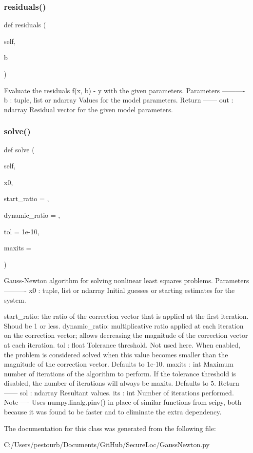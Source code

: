 \subsubsection{\texorpdfstring{residuals()}{residuals()}}
{\footnotesize\ttfamily def residuals (\begin{DoxyParamCaption}\item[{}]{self,  }\item[{}]{b }\end{DoxyParamCaption})}

\begin{DoxyVerb}Evaluate the residuals f(x, b) - y with the given parameters.
Parameters
----------
b : tuple, list or ndarray
    Values for the model parameters.
Return
------
out : ndarray
    Residual vector for the given model parameters.
\end{DoxyVerb}
 \mbox{\label{class_gauss_newton_1_1_g_ndataset_a761f3746fb20b84ec70f2939300ca517}} 
\subsubsection{\texorpdfstring{solve()}{solve()}}
{\footnotesize\ttfamily def solve (\begin{DoxyParamCaption}\item[{}]{self,  }\item[{}]{x0,  }\item[{}]{start\+\_\+ratio = {},  }\item[{}]{dynamic\+\_\+ratio = {},  }\item[{}]{tol = {\ttfamily 1e-\/10},  }\item[{}]{maxits = {} }\end{DoxyParamCaption})}

\begin{DoxyVerb}Gauss-Newton algorithm for solving nonlinear least squares problems.
Parameters
----------
x0 : tuple, list or ndarray
    Initial guesses or starting estimates for the system.

start_ratio: the ratio of the correction vector that is applied at the first iteration. Shoud be 1 or less.
dynamic_ratio: multiplicative ratio applied at each iteration on the correction vector;
       allows decreasing the magnitude of the correction vector at each iteration.
tol : float
    Tolerance threshold. Not used here. When enabled, the problem is considered solved when this value
    becomes smaller than the magnitude of the correction vector.
    Defaults to 1e-10.
maxits : int
    Maximum number of iterations of the algorithm to perform.
    If the tolerance threshold is disabled, the number of iterations will always be maxits.
    Defaults to 5.
Return
------
sol : ndarray
    Resultant values.
its : int
    Number of iterations performed.
Note
----
Uses numpy.linalg.pinv() in place of similar functions from scipy, both
because it was found to be faster and to eliminate the extra dependency.
\end{DoxyVerb}
 

The documentation for this class was generated from the following file\+:\begin{DoxyCompactItemize}
\item 
C\+:/\+Users/pestourb/\+Documents/\+Git\+Hub/\+Secure\+Loc/Gauss\+Newton.\+py\end{DoxyCompactItemize}
